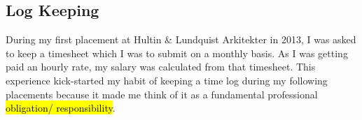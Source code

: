 \subsection{Log Keeping}

During my first placement at Hultin \& Lundquist Arkitekter in 2013, I was asked to keep a timesheet which I was to submit on a monthly basis.
As I was getting paid an hourly rate, my salary was calculated from that timesheet.
This experience kick-started my habit of keeping a time log during my following placements because it made me think of it as a fundamental professional \hl{obligation/ responsibility}.


